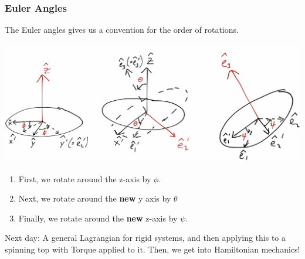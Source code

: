 \subsubsection{Euler Angles}
The Euler angles gives us a convention for the order of rotations.
\begin{center}
    \includegraphics[scale=0.5]{Lecture-20/l20-img8.png}
\end{center}
\begin{enumerate}[1.]
\item First, we rotate around the z-axis by $\phi$.
\item Next, we rotate around the \textbf{new} y axis by $\theta$
\item Finally, we rotate around the \textbf{new} z-axis by $\psi$.
\end{enumerate}
Next day: A general Lagrangian for rigid systems, and then applying this to a spinning top with Torque applied to it. Then, we get into Hamiltonian mechanics!